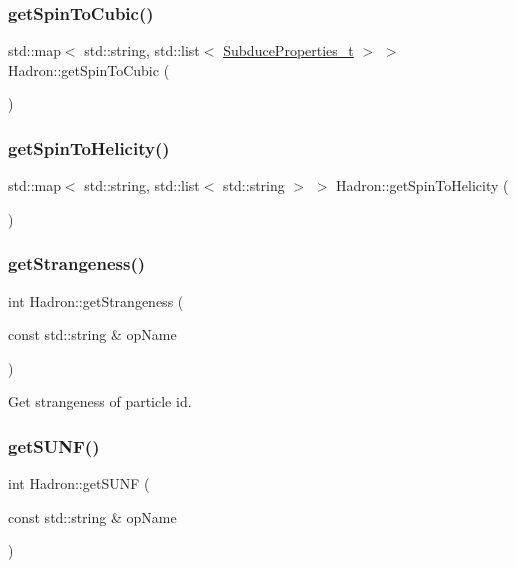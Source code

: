 \subsubsection{\texorpdfstring{getSpinToCubic()}{getSpinToCubic()}}
{\footnotesize\ttfamily std\+::map$<$ std\+::string, std\+::list$<$ \mbox{\hyperlink{structHadron_1_1SubduceProperties__t}{Subduce\+Properties\+\_\+t}} $>$ $>$ Hadron\+::get\+Spin\+To\+Cubic (\begin{DoxyParamCaption}{ }\end{DoxyParamCaption})}

\mbox{\label{namespaceHadron_a65015bc93f8b83c79f094361b407ed28}} 
\subsubsection{\texorpdfstring{getSpinToHelicity()}{getSpinToHelicity()}}
{\footnotesize\ttfamily std\+::map$<$ std\+::string, std\+::list$<$ std\+::string $>$ $>$ Hadron\+::get\+Spin\+To\+Helicity (\begin{DoxyParamCaption}{ }\end{DoxyParamCaption})}

\mbox{\label{namespaceHadron_adfdd6762b0b73d56c308a674d4c0164d}} 
\subsubsection{\texorpdfstring{getStrangeness()}{getStrangeness()}}
{\footnotesize\ttfamily int Hadron\+::get\+Strangeness (\begin{DoxyParamCaption}\item[{const std\+::string \&}]{op\+Name }\end{DoxyParamCaption})}



Get strangeness of particle id. 

\mbox{\label{namespaceHadron_a61e330de82814218612462c430ceaeb9}} 
\subsubsection{\texorpdfstring{getSUNF()}{getSUNF()}}
{\footnotesize\ttfamily int Hadron\+::get\+S\+U\+NF (\begin{DoxyParamCaption}\item[{const std\+::string \&}]{op\+Name }\end{DoxyParamCaption})}



